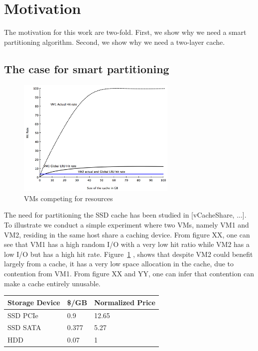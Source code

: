 
\section{Motivation}
The motivation for this work are two-fold. First, we show why we need a smart partitioning algorithm. Second, we show why we need a two-layer cache.

\subsection{The case for smart partitioning}

\begin{figure}[tb]
\setlength{\belowcaptionskip}{-15pt}
\centering
\includegraphics[width=3in]{figures/hitrate_fake}
\caption{VMs competing for resources}
\label{fig:compete}
\end{figure}

The need for partitioning the SSD cache has been studied in [vCacheShare, ...]. To illustrate we conduct a simple experiment where two VMs, namely VM1 and VM2, residing in the same host share a caching device. From figure XX, one can see that VM1 has a high random I/O with a very low hit ratio while VM2 has a low I/O but has a high hit rate. Figure~\ref{fig:compete} , shows that despite VM2 could benefit largely from a cache, it has a very low space allocation in the cache, due to contention from VM1. From figure XX and YY, one can infer that contention can make a cache entirely unusable.

\begin{center}
  \begin{tabular}{ | l | l | l | }
    \hline
    \textbf{Storage Device} & \textbf{\$/GB} & \textbf{Normalized Price} \\ \hline
    SSD PCIe & 0.9 & 12.65 \\ \hline
    SSD SATA & 0.377 & 5.27 \\ \hline
    HDD & 0.07 & 1 \\
    \hline
  \end{tabular}
\end{center}

